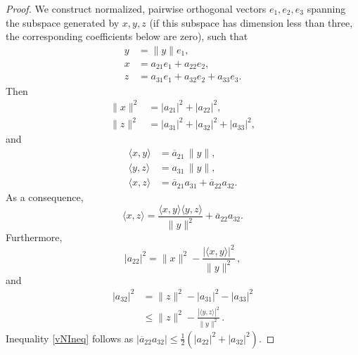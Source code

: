 \documentclass[twoside,11pt,letter]{article}
\theoremstyle{definition}
\theoremstyle{definition}
\theoremstyle{plain}
\begin{document}
\begin{proof}
We construct normalized, pairwise orthogonal vectors $e_1,e_2,e_3$ spanning the subspace generated by $x,y,z$ (if this subspace has dimension less than three, the corresponding coefficients below are zero), such that
\begin{equation*}
\begin{split}
y&=\|y\|e_1,\\
x&=a_{21}e_1+a_{22}e_2,\\
z&=a_{31}e_1+a_{32}e_2+a_{33}e_3.
\end{split}
\end{equation*}
Then
\begin{equation*}
\begin{split}
\|x\|^2&=|a_{21}|^2+|a_{22}|^2,\\
\|z\|^2&=|a_{31}|^2+|a_{32}|^2+|a_{33}|^2,
\end{split}
\end{equation*}
and
\begin{equation*}
\begin{split}
\langle x,y\rangle&=\overline{a}_{21}\,\|y\|,\\
\langle y,z\rangle&=a_{31}\,\|y\|,\\
\langle x,z\rangle&=\overline{a}_{21}a_{31}+\overline{a}_{22}a_{32}.
\end{split}
\end{equation*}
As a consequence,
\begin{equation*}
\langle x,z\rangle=\frac{\langle x,y\rangle\langle y,z\rangle}{\|y\|^2}+\overline{a}_{22}a_{32}.
\end{equation*}
Furthermore,
\begin{equation*}
|a_{22}|^2=\|x\|^2-\frac{|\langle x,y\rangle|^2}{\|y\|^2}\,,
\end{equation*}
and
\begin{equation*}
\begin{split}
|a_{32}|^2&=\|z\|^2-|a_{31}|^2-|a_{33}|^2\\
&\leq\|z\|^2-\frac{|\langle y,z\rangle|^2}{\|y\|^2}\,.
\end{split}
\end{equation*}
Inequality \eqref{vNIneq} follows as $|\overline{a}_{22}a_{32}|\leq\frac12(|a_{22}|^2+|a_{32}|^2)$.
\end{proof}
\end{document}

